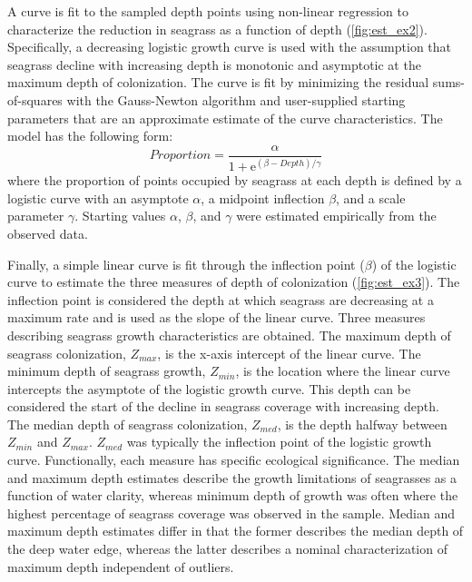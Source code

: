 \documentclass[letterpaper,12pt,oneside]{article}\usepackage[]{graphicx}\usepackage[]{color}
\begin{document}
A curve is fit to the sampled depth points using non-linear regression to characterize the reduction in seagrass as a function of depth (\cref{fig:est_ex2}).  Specifically, a decreasing logistic growth curve is used with the assumption that seagrass decline with increasing depth is monotonic and asymptotic at the maximum depth of colonization. The curve is fit by minimizing the residual sums-of-squares with the Gauss-Newton algorithm \citep{Bates92} and user-supplied starting parameters that are an approximate estimate of the curve characteristics.  The model has the following form:
\begin{equation} \label{eqn:prop}
 Proportion = \frac{\alpha}{1 + \mathrm{e}^{{\left(\beta - Depth\right)/\gamma}}}
\end{equation}
where the proportion of points occupied by seagrass at each depth is defined by a logistic curve with an asymptote $\alpha$, a midpoint inflection $\beta$, and a scale parameter $\gamma$.  Starting values $\alpha$, $\beta$, and $\gamma$ were estimated empirically from the observed data.  

Finally, a simple linear curve is fit through the inflection point ($\beta$) of the logistic curve to estimate the three measures of depth of colonization (\cref{fig:est_ex3}).  The inflection point is considered the depth at which seagrass are decreasing at a maximum rate and is used as the slope of the linear curve.  Three measures describing seagrass growth characteristics are obtained. The maximum depth of seagrass colonization, $Z_{max}$, is the x-axis intercept of the linear curve.  The minimum depth of seagrass growth, $Z_{min}$, is the location where the linear curve intercepts the asymptote of the logistic growth curve.  This depth can be considered the start of the decline in seagrass coverage with increasing depth.  The median depth of seagrass colonization, $Z_{med}$, is the depth halfway between $Z_{min}$ and $Z_{max}$.  $Z_{med}$ was typically the inflection point of the logistic growth curve.  Functionally, each measure has specific ecological significance.  The median and maximum depth estimates describe the growth limitations of seagrasses as a function of water clarity, whereas minimum depth of growth was often where the highest percentage of seagrass coverage was observed in the sample.  Median and maximum depth estimates differ in that the former describes the median depth of the deep water edge, whereas the latter describes a nominal characterization of maximum depth independent of outliers.
\end{document}
